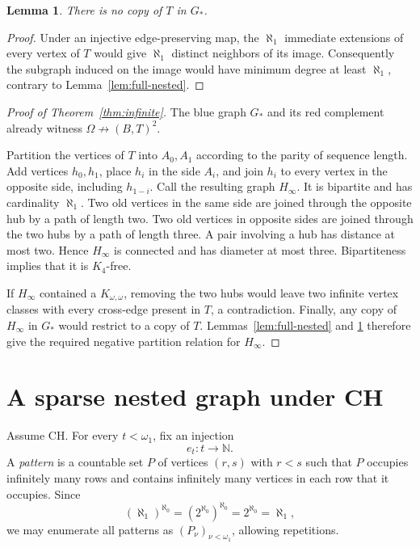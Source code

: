 \documentclass[10pt,letterpaper,leqno]{amsart}
\numberwithin{equation}{section}
\newtheorem{lemma}[theorem]{Lemma}
\theoremstyle{definition}
\theoremstyle{remark}
\newcommand{\CH}{\mathrm{CH}}
\newcommand{\NN}{\mathbb N}
\begin{document}
\begin{lemma}\label{lem:tree-omitted}
There is no copy of $T$ in $G_*$.
\end{lemma}

\begin{proof}
Under an injective edge-preserving map, the $\aleph_1$ immediate
extensions of every vertex of $T$ would give $\aleph_1$ distinct
neighbors of its image. Consequently the subgraph induced on the image
would have minimum degree at least $\aleph_1$, contrary to
Lemma~\ref{lem:full-nested}.
\end{proof}

\begin{proof}[Proof of Theorem~\ref{thm:infinite}]
The blue graph $G_*$ and its red complement already witness
$\Omega\not\to(B,T)^2$.

Partition the vertices of $T$ into $A_0,A_1$ according to the parity of
sequence length. Add vertices $h_0,h_1$, place $h_i$ in the side $A_i$,
and join $h_i$ to every vertex in the opposite side, including $h_{1-i}$.
Call the resulting graph $H_\infty$.
It is bipartite and has cardinality $\aleph_1$.
Two old vertices in the same side are joined through the opposite hub
by a path of length two. Two old vertices in opposite sides are joined
through the two hubs by a path of length three. A pair involving a hub
has distance at most two. Hence $H_\infty$ is connected and has diameter
at most three. Bipartiteness implies that it is $K_4$-free.

If $H_\infty$ contained a $K_{\omega,\omega}$, removing the two hubs
would leave two infinite vertex classes with every cross-edge present
in $T$, a contradiction. Finally, any copy of $H_\infty$ in $G_*$ would
restrict to a copy of $T$. Lemmas~\ref{lem:full-nested} and
\ref{lem:tree-omitted} therefore give the required negative partition
relation for $H_\infty$.
\end{proof}

\section{A sparse nested graph under CH}

Assume $\CH$. For every $t<\omega_1$, fix an injection
\[
 e_t\colon t\longrightarrow\NN.
\]
A \emph{pattern} is a countable set $P$ of vertices $(r,s)$ with $r<s$
such that $P$ occupies infinitely many rows and contains infinitely many
vertices in each row that it occupies. Since
\[
 (\aleph_1)^{\aleph_0}
 =(2^{\aleph_0})^{\aleph_0}
 =2^{\aleph_0}=\aleph_1,
\]
we may enumerate all patterns as $(P_\nu)_{\nu<\omega_1}$, allowing
repetitions.
\end{document}
